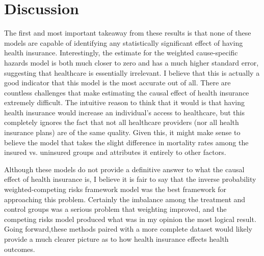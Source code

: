 \documentclass{article}
\begin{document}
\section{Discussion}
The first and most important takeaway from these results is that none of these models are capable of identifying any statistically significant effect of having health insurance. Interestingly, the estimate for the weighted cause-specific hazards model is both much closer to zero and has a much higher standard error, suggesting that healthcare is essentially irrelevant. I believe that this is actually a good indicator that this model is the most accurate out of all. There are countless challenges that make estimating the causal effect of health insurance extremely difficult. The intuitive reason to think that it would is that having health insurance would increase an individual's access to healthcare, but this completely ignores the fact that not all healthcare providers (nor all health insurance plans) are of the same quality. Given this, it might make sense to believe the model that takes the slight difference in mortality rates among the insured vs. uninsured groups and attributes it entirely to other factors. 

Although these models do not provide a definitive answer to what the causal effect of health insurance is, I believe it is fair to say that the inverse probability weighted-competing risks framework model was the best framework for approaching this problem. Certainly the imbalance among the treatment and control groups was a serious problem that weighting improved, and the competing risks model produced what was in my opinion the most logical result. Going forward,these methods paired with a more complete dataset would likely provide a much clearer picture as to how health insurance effects health outcomes. 



\clearpage
\appendix
\end{document}
